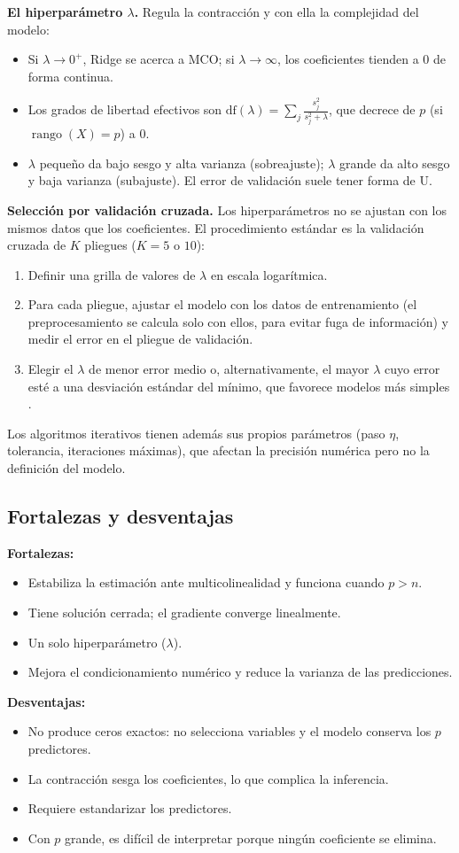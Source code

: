 \documentclass[11pt,a4paper]{article}
\theoremstyle{simple}
\begin{document}
\textbf{El hiperparámetro $\lambda$.} Regula la contracción y con ella la complejidad del modelo:
\begin{itemize}
\item Si $\lambda\to0^+$, Ridge se acerca a MCO; si $\lambda\to\infty$, los coeficientes tienden a $0$ de forma continua.
\item Los grados de libertad efectivos son $\mathrm{df}(\lambda)=\sum_j\frac{s_j^2}{s_j^2+\lambda}$, que decrece de $p$ (si $\operatorname{rango}(X)=p$) a $0$.
\item $\lambda$ pequeño da bajo sesgo y alta varianza (sobreajuste); $\lambda$ grande da alto sesgo y baja varianza (subajuste). El error de validación suele tener forma de U.
\end{itemize}

\textbf{Selección por validación cruzada.}\label{sec:cv} Los hiperparámetros no se ajustan con los mismos datos que los coeficientes. El procedimiento estándar es la validación cruzada de $K$ pliegues ($K=5$ o $10$):
\begin{enumerate}
\item Definir una grilla de valores de $\lambda$ en escala logarítmica.
\item Para cada pliegue, ajustar el modelo con los datos de entrenamiento (el preprocesamiento se calcula solo con ellos, para evitar fuga de información) y medir el error en el pliegue de validación.
\item Elegir el $\lambda$ de menor error medio o, alternativamente, el mayor $\lambda$ cuyo error esté a una desviación estándar del mínimo, que favorece modelos más simples \cite{hastie2009}.
\end{enumerate}
Los algoritmos iterativos tienen además sus propios parámetros (paso $\eta$, tolerancia, iteraciones máximas), que afectan la precisión numérica pero no la definición del modelo.

\subsection{Fortalezas y desventajas}
\textbf{Fortalezas:}
\begin{itemize}
\item Estabiliza la estimación ante multicolinealidad y funciona cuando $p>n$.
\item Tiene solución cerrada; el gradiente converge linealmente.
\item Un solo hiperparámetro ($\lambda$).
\item Mejora el condicionamiento numérico y reduce la varianza de las predicciones.
\end{itemize}
\textbf{Desventajas:}
\begin{itemize}
\item No produce ceros exactos: no selecciona variables y el modelo conserva los $p$ predictores.
\item La contracción sesga los coeficientes, lo que complica la inferencia.
\item Requiere estandarizar los predictores.
\item Con $p$ grande, es difícil de interpretar porque ningún coeficiente se elimina.
\end{itemize}
\end{document}
